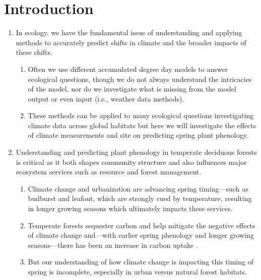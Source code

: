 \documentclass{article}\usepackage[]{graphicx}\usepackage[]{color}
\begin{document}
\section*{Introduction}
\begin{enumerate}
\item In ecology, we have the fundamental issue of understanding and applying methods to accurately predict shifts in climate and the broader impacts of these shifts.
  \begin{enumerate}
  \item Often we use different accumulated degree day models to answer ecological questions, though we do not always understand the intricacies of the model, nor do we investigate what is missing from the model output or even input (i.e., weather data methods).
  \item These methods can be applied to many ecological questions investigating climate data across global habitats but here we will investigate the effects of climate measurements and site on predicting spring plant phenology. 
  \end{enumerate}
  
\item Understanding and predicting plant phenology in temperate deciduous forests is critical as it both shapes community structure and also influences major ecosystem services such as resource and forest management. 
  \begin{enumerate} 
  \item Climate change and urbanization are advancing spring timing---such as budburst and leafout, which  are strongly cued by temperature, resulting in longer growing seasons \citep{Chuine2001} which ultimately impacts these services.  
  \item Temperate forests sequester carbon and help mitigate the negative effects of climate change and---with earlier spring phenology and longer growing seasons---there has been an increase in carbon uptake \citep{Keenan2014}.
  \item But our understanding of how climate change is impacting this timing of spring is incomplete, especially in urban versus natural forest habitats. 
  \end{enumerate}
  

\end{enumerate}
\end{document}
